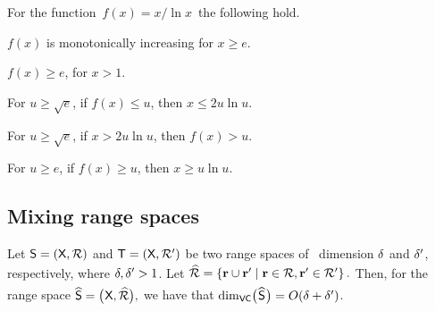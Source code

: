 \begin{lemma}
    For the function $\,f(x) = x / \ln x\,$ the following hold.
    \begin{compactenumA}
        \item $f(x)$ is monotonically increasing for $x \geq e$.
        \item $f(x) \geq e$, for $x >1$.
        \item For $u \geq \sqrt{e}$, if $f(x) \leq u$, then $x \leq 2
        u \ln u$.
        \item For $u \geq \sqrt{e}$, if $x > 2 u \ln u$, then $f(x) >
        u$.
        \label{nemesis:function:part:D}
        
        \item For $u \geq e$, if $f(x) \geq u$, then $x \geq u \ln u$.
    \end{compactenumA}
\end{lemma}


\subsection{Mixing range spaces}


\begin{lemma}
    Let $\mathsf{S} = (\textsf{X},{\mathcal{R}})$ and
    $\mathsf{T} = (\textsf{X},\mathcal{R}')$ be two range spaces of
    ~\VC dimension $\delta$ and $\delta'$, respectively, where
    $\delta, \delta' > 1$. Let
    \begin{math}
        \Bigl.  \widehat{\RangeSet}%
        =%
        \Set{\range \cup \rangeA}{ \range \in \RangeSet, \rangeA \in
           \RangeSetA}.
    \end{math}
      Then, for the range
    space
    \begin{math}
        \widehat{\mathsf{S}} = \bigl( \hspace{0.6pt} \textsf{X},
        \widehat{{\mathcal{R}}} \bigr),
    \end{math}
     we have that
    $\mathrm{dim}_{\mathsf{VC}}\bigl( \hspace{0.6pt} \widehat{\mathsf{S}} \hspace{0.6pt} \bigr)=O(\delta +
    \delta')$.
\end{lemma}

